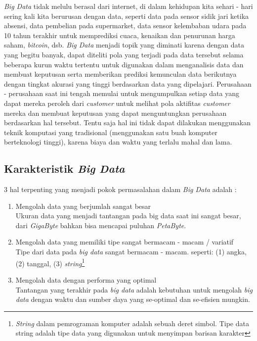 {\it Big Data} tidak melulu berasal dari internet, di dalam kehidupan kita sehari - hari sering kali kita berurusan dengan data, seperti data pada sensor sidik jari ketika absensi, data pembelian pada supermarket, data sensor kelembaban udara pada 10 tahun terakhir untuk memprediksi cuaca, kenaikan dan penurunan harga saham, {\it bitcoin}, dsb. {\it Big Data} menjadi topik yang diminati karena dengan data yang begitu banyak, dapat diteliti pola yang terjadi pada data tersebut selama beberapa kurun waktu tertentu untuk digunakan dalam menganalisis data dan membuat keputusan serta memberikan prediksi kemunculan data berikutnya dengan tingkat akurasi yang tinggi berdasarkan data yang dipelajari. Perusahaan - perusahaan saat ini tengah memulai untuk mengumpulkan setiap data yang dapat mereka peroleh dari {\it customer} untuk melihat pola aktifitas {\it customer} mereka dan membuat keputusan yang dapat menguntungkan perusahaan berdasarkan hal tersebut. Tentu saja hal ini tidak dapat dilakukan menggunakan teknik komputasi yang tradisional (menggunakan satu buah komputer berteknologi tinggi), karena biaya dan waktu yang terlalu mahal dan lama.

\subsection{Karakteristik {\it Big Data}}

 3 hal terpenting yang menjadi pokok permasalahan dalam {\it Big Data} adalah : 
\begin{enumerate}
	\item{Mengolah data yang berjumlah sangat besar} \\
	Ukuran data yang menjadi tantangan pada big data saat ini sangat besar, dari \textit{GigaByte} bahkan bisa mencapai puluhan \textit{PetaByte}.
	\item{Mengolah data yang memiliki tipe sangat bermacam - macam / variatif} \\
	Tipe dari data pada \textit{big data} sangat bermacam - macam. seperti: (1) angka, (2) tanggal, (3) \textit{string}\footnote{\textit{String} dalam pemrograman komputer adalah sebuah deret simbol. Tipe data string adalah tipe data yang digunakan untuk menyimpan barisan karakter}
	\item{Mengolah data dengan performa yang optimal}\\
	Tantangan yang terakhir pada \textit{big data} adalah kebutuhan untuk mengolah \textit{big data} dengan waktu dan sumber daya yang se-optimal dan se-efisien mungkin.
\end{enumerate}

